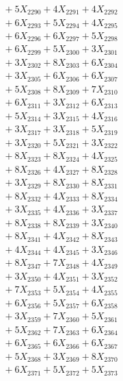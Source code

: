 \documentclass[a4paper,10pt]{article}
\begin{document}
{\begin{align}
&\;  + 5 X_{2290} + 4 X_{2291} + 4 X_{2292} \\[0.3ex]
&\;  + 6 X_{2293} + 5 X_{2294} + 4 X_{2295} \\[0.3ex]
&\;  + 6 X_{2296} + 6 X_{2297} + 5 X_{2298} \\[0.3ex]
&\;  + 6 X_{2299} + 5 X_{2300} + 3 X_{2301} \\[0.3ex]
&\;  + 3 X_{2302} + 8 X_{2303} + 6 X_{2304} \\[0.3ex]
&\;  + 3 X_{2305} + 6 X_{2306} + 6 X_{2307} \\[0.3ex]
&\;  + 5 X_{2308} + 8 X_{2309} + 7 X_{2310} \\[0.3ex]
&\;  + 6 X_{2311} + 3 X_{2312} + 6 X_{2313} \\[0.3ex]
&\;  + 5 X_{2314} + 3 X_{2315} + 4 X_{2316} \\[0.3ex]
&\;  + 3 X_{2317} + 3 X_{2318} + 5 X_{2319} \\[0.5ex]\allowbreak
&\;  + 3 X_{2320} + 5 X_{2321} + 3 X_{2322} \\[0.3ex]
&\;  + 8 X_{2323} + 8 X_{2324} + 4 X_{2325} \\[0.3ex]
&\;  + 8 X_{2326} + 4 X_{2327} + 8 X_{2328} \\[0.3ex]
&\;  + 3 X_{2329} + 8 X_{2330} + 8 X_{2331} \\[0.3ex]
&\;  + 8 X_{2332} + 4 X_{2333} + 8 X_{2334} \\[0.3ex]
&\;  + 3 X_{2335} + 4 X_{2336} + 3 X_{2337} \\[0.3ex]
&\;  + 8 X_{2338} + 8 X_{2339} + 3 X_{2340} \\[0.3ex]
&\;  + 8 X_{2341} + 4 X_{2342} + 8 X_{2343} \\[0.3ex]
&\;  + 4 X_{2344} + 4 X_{2345} + 3 X_{2346} \\[0.3ex]
&\;  + 8 X_{2347} + 7 X_{2348} + 4 X_{2349} \\[0.5ex]\allowbreak
&\;  + 3 X_{2350} + 4 X_{2351} + 3 X_{2352} \\[0.3ex]
&\;  + 7 X_{2353} + 5 X_{2354} + 4 X_{2355} \\[0.3ex]
&\;  + 6 X_{2356} + 5 X_{2357} + 6 X_{2358} \\[0.3ex]
&\;  + 3 X_{2359} + 7 X_{2360} + 5 X_{2361} \\[0.3ex]
&\;  + 5 X_{2362} + 7 X_{2363} + 6 X_{2364} \\[0.3ex]
&\;  + 6 X_{2365} + 6 X_{2366} + 6 X_{2367} \\[0.3ex]
&\;  + 5 X_{2368} + 3 X_{2369} + 8 X_{2370} \\[0.3ex]
&\;  + 6 X_{2371} + 5 X_{2372} + 5 X_{2373} \\[0.3ex]

\end{align}}
\end{document}
